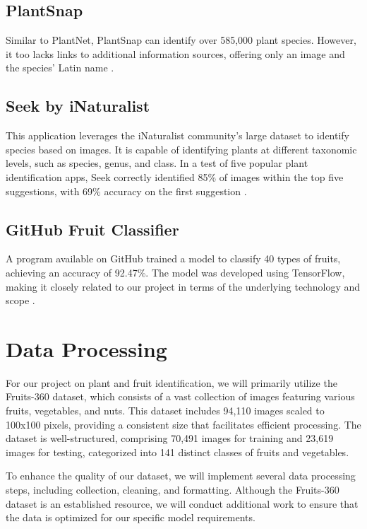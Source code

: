 \documentclass{article} %
\begin{document}
\subsection{PlantSnap}
Similar to PlantNet, PlantSnap can identify over 585,000 plant 
species. However, it too lacks links to additional information 
sources, offering only an image and the species’ Latin name \citep{bilyk2020assessment}.

\subsection{Seek by iNaturalist}
This application leverages the iNaturalist community's large 
dataset to identify species based on images. It is capable of 
identifying plants at different taxonomic levels, such as species, 
genus, and class. In a test of five popular plant identification
apps, Seek correctly identified 85\% of images within the top five 
suggestions, with 69\% accuracy on the first suggestion \citep{inaturalist_taxa}\citep{hart2023assessing}.

\subsection{GitHub Fruit Classifier}
A program available on GitHub trained a model to classify 40 types 
of fruits, achieving an accuracy of 92.47\%. The model was 
developed using TensorFlow, making it closely related to our 
project in terms of the underlying technology and scope \citep{aparande_fruit_classification}.


\section{Data Processing}
For our project on plant and fruit identification, we will primarily utilize the Fruits-360 dataset, which consists of a vast collection of images featuring various fruits, vegetables, and nuts. This dataset includes 94,110 images scaled to 100x100 pixels, providing a consistent size that facilitates efficient processing. The dataset is well-structured, comprising 70,491 images for training and 23,619 images for testing, categorized into 141 distinct classes of fruits and vegetables.~\citep{moltean_fruits_360}

To enhance the quality of our dataset, we will implement several data processing steps, including collection, cleaning, and formatting. Although the Fruits-360 dataset is an established resource, we will conduct additional work to ensure that the data is optimized for our specific model requirements.
\end{document}
